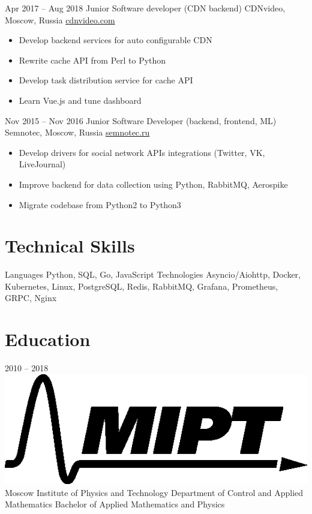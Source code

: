 \documentclass[11pt,a4paper]{moderncv}
\begin{document}
  \cventry
    {Apr 2017 – Aug 2018}
    {Junior Software developer (CDN backend)}
    {CDNvideo, Moscow, Russia}
    {\url{cdnvideo.com}}
    {}
    {
      \begin{itemize}\setlength\itemindent{6pt}
        \item Develop backend services for auto configurable CDN
        \item Rewrite cache API from Perl to Python
        \item Develop task distribution service for cache API
        \item Learn Vue.js and tune dashboard
      \end{itemize}
    }

  \cventry
    {Nov 2015 – Nov 2016}
    {Junior Software Developer (backend, frontend, ML)}
    {Semnotec, Moscow, Russia}
    {\url{semnotec.ru}}
    {}
    {
      \begin{itemize}\setlength\itemindent{6pt}
        \item Develop drivers for social network APIs integrations (Twitter, VK, LiveJournal)
        \item Improve backend for data collection using Python, RabbitMQ, Aerospike
        \item Migrate codebase from Python2 to Python3
      \end{itemize}
    }

\section{Technical Skills}
  \cvline
    {Languages}{
      Python,
      SQL,
      Go,
      JavaScript
    }
  \cvline
    {Technologies}{
      Asyncio/Aiohttp,
      Docker,
      Kubernetes,
      Linux,
      PostgreSQL,
      Redis,
      RabbitMQ,
      Grafana,
      Prometheus,
      GRPC,
      Nginx
    }

\section{Education}
  \vspace*{-5mm}
  \cventry
    {2010 – 2018}
    {\includegraphics[scale=0.25]{assets/mipt} Moscow Institute of Physics and Technology}
    {}
    {}{}
    {
      Department of Control and Applied Mathematics \newline{}
      Bachelor of Applied Mathematics and Physics \newline{}
    }
    {}
\end{document}
